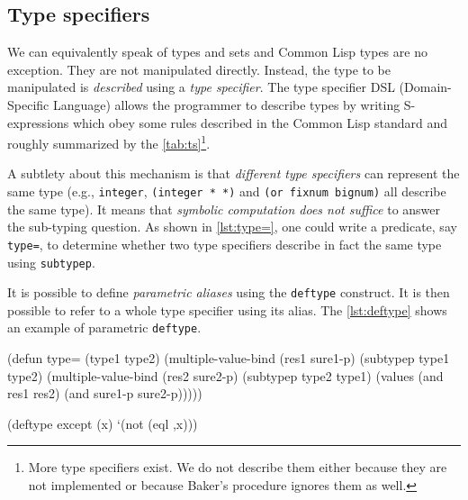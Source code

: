 \documentclass[format=sigconf]{acmart}
\newcommand\code[2][\small]{\sloppy\texttt{#1#2}}
\theoremstyle{definition}
\begin{document}
\subsection{Type specifiers}
We can equivalently speak of types and sets and Common Lisp types are no
exception. They are not manipulated directly. Instead, the type to be
manipulated is \emph{described} using a \emph{type specifier}.
The type specifier DSL (Domain-Specific Language) allows the programmer to
describe types by writing S-expressions which obey some rules described in the
Common Lisp standard \cite{bib:ansi.94.cl} and roughly summarized by the
\vref{tab:ts}\footnote{More type specifiers exist. We do not describe them either
  because they are not implemented or because Baker's procedure ignores them as well.}.

A subtlety about this mechanism is that \emph{different type specifiers} can
represent the same type (e.g., \code{integer}, \code{(integer * *)} and
\code{(or fixnum bignum)} all describe the same type). It means that
\emph{symbolic computation does not suffice} to answer the sub-typing question.
As shown in \vref{lst:type=}, one could write a predicate, say \code{type=}, to
determine whether two type specifiers describe in fact the same type using
\code{subtypep}.

It is possible to define \emph{parametric aliases} using the \code{deftype}
construct. It is then possible to refer to a whole type specifier using its
alias. The \vref{lst:deftype} shows an example of parametric \code{deftype}.

\begin{listing}
\begin{clcode}
(defun type= (type1 type2)
  (multiple-value-bind (res1 sure1-p)
      (subtypep type1 type2)
    (multiple-value-bind (res2 sure2-p)
        (subtypep type2 type1)
      (values (and res1 res2)
              (and sure1-p sure2-p)))))
\end{clcode}
\caption{The predicate \code{type=}}
\label{lst:type=}
\end{listing}

\begin{listing}
\begin{clcode}
(deftype except (x)
  `(not (eql ,x)))
\end{clcode}
\caption{The \code{deftype} construct}
\label{lst:deftype}
\end{listing}
\end{document}
